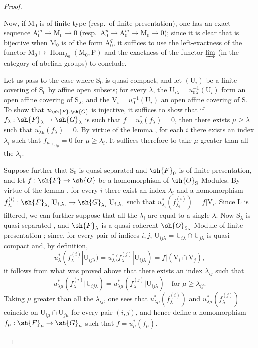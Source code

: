 \begin{proof}
\begin{enumerate}[label=(\roman*)]
Now, if $\mathrm{M}_0$ is of finite type (resp.\ of finite presentation), one has an exact sequence $\mathrm{A}_0^m\to\mathrm{M}_0\to 0$ (resp.\ $\mathrm{A}_0^n\to\mathrm{A}_0^m\to\mathrm{M}_0\to 0$); since it is clear that  is bijective when $\mathrm{M}_0$ is of the form $\mathrm{A}_0^q$, it suffices to use the left-exactness of the functor $\mathrm{M}_0\mapsto\operatorname{Hom}_{\mathrm{A}_0}(\mathrm{M}_0,\mathrm{P})$ and the exactness of the functor $\varinjlim$ (in the category of abelian groups) to conclude.

\medskip
Let us pass to the case where $\mathrm{S}_0$ is quasi-compact, and let $(\mathrm{U}_i)$ be a finite covering of $\mathrm{S}_0$ by affine open subsets; for every $\lambda$, the $\mathrm{U}_{i\lambda}=u_{0\lambda}^{-1}(\mathrm{U}_i)$ form an open affine covering of $\mathrm{S}_\lambda$, and the $\mathrm{V}_i=u_0^{-1}(\mathrm{U}_i)$ an open affine covering of $\mathrm{S}$.
To show that $u_{\sh{F},\sh{G}}$ is injective, it suffices to show that if $f_\lambda:\sh{F}_\lambda\to\sh{G}_\lambda$ is such that $f=u_\lambda^*(f_\lambda)=0$, then there exists $\mu\geqslant\lambda$ such that $u_{\lambda\mu}^*(f_\lambda)=0$.
By virtue of the lemma , for each $i$ there exists an index $\lambda_i$ such that $f_\mu|_{\mathrm{U}_{i\mu}}=0$ for $\mu\geqslant\lambda_i$.
It suffices therefore to take $\mu$ greater than all the $\lambda_i$.

Suppose further that $\mathrm{S}_0$ is quasi-separated and $\sh{F}_0$ is of finite presentation, and let $f:\sh{F}\to\sh{G}$ be a homomorphism of $\sh{O}_\mathrm{S}$-Modules.
By virtue of the lemma , for every $i$ there exist an index $\lambda_i$ and a homomorphism $f_{\lambda_i}^{(i)}:\sh{F}_{\lambda_i}|\mathrm{U}_{i,\lambda_i}\to\sh{G}_{\lambda_i}|\mathrm{U}_{i,\lambda_i}$ such that $u_{\lambda_i}^*(f_{\lambda_i}^{(i)})=f|\mathrm{V}_i$.
Since $\mathrm{L}$ is filtered, we can further suppose that all the $\lambda_i$ are equal to a single $\lambda$.
Now $\mathrm{S}_\lambda$ is quasi-separated , and $\sh{F}_\lambda$ is a quasi-coherent $\sh{O}_{\mathrm{S}_\lambda}$-Module of finite presentation ; since, for every pair of indices $i,j$, $\mathrm{U}_{ij\lambda}=\mathrm{U}_{i\lambda}\cap\mathrm{U}_{j\lambda}$ is quasi-compact and, by definition,
\[
  u_\lambda^*(f_\lambda^{(i)}|\mathrm{U}_{ij\lambda})=u_\lambda^*(f_\lambda^{(j)}|\mathrm{U}_{ij\lambda})=f|(\mathrm{V}_i\cap\mathrm{V}_j),
\]
it follows from what was proved above that there exists an index $\lambda_{ij}$ such that
\[
  u_{\lambda\mu}^*(f_\lambda^{(i)}|\mathrm{U}_{ij\lambda})=u_{\lambda\mu}^*(f_\lambda^{(j)}|\mathrm{U}_{ij\lambda})\quad\text{for }\mu\geqslant\lambda_{ij}.
\]
Taking $\mu$ greater than all the $\lambda_{ij}$, one sees that $u_{\lambda\mu}^*(f_\lambda^{(i)})$ and $u_{\lambda\mu}^*(f_\lambda^{(j)})$ coincide on $\mathrm{U}_{i\mu}\cap\mathrm{U}_{j\mu}$ for every pair $(i,j)$, and hence define a homomorphism $f_\mu:\sh{F}_\mu\to\sh{G}_\mu$ such that $f=u_\mu^*(f_\mu)$.

\end{enumerate}
\end{proof}

